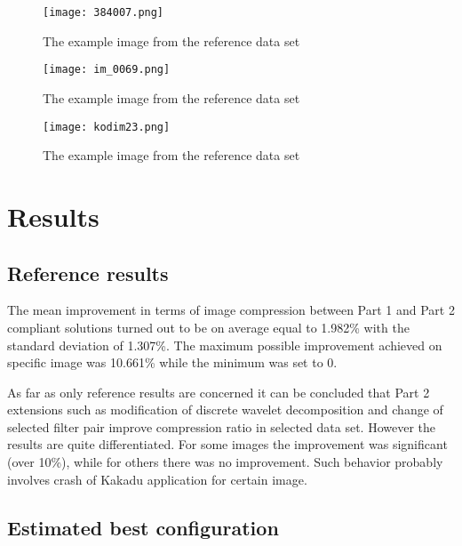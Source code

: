 \begin{figure}[!htb]
    \centering
    \texttt{[image: 384007.png]}
    \caption{The example image from the reference data set \cite{ref_images}}
    \label{fig:example_1}
\end{figure}

\begin{figure}[!htb]
    \centering
    \texttt{[image: im\_0069.png]}
    \caption{The example image from the reference data set \cite{ref_images}}
    \label{fig:example_2}
\end{figure}

\begin{figure}[!htb]
    \centering
    \texttt{[image: kodim23.png]}
    \caption{The example image from the reference data set \cite{ref_images}}
    \label{fig:example_3}
\end{figure}


\section{Results}

\subsection{Reference results} \label{sec:ref_results}

The mean improvement in terms of image compression between Part 1 and Part 2 compliant solutions
turned out to be on average equal to 1.982\% with the standard deviation of 1.307\%. The maximum
possible improvement achieved on specific image was 10.661\% while the minimum was set to 0.

As far as only reference results are concerned it can be concluded that Part 2 extensions such as modification
of discrete wavelet decomposition and change of selected filter pair improve compression ratio
in selected data set. However the results are quite differentiated. For some images the improvement
was significant (over 10\%), while for others there was no improvement. Such behavior probably
involves crash of Kakadu application for certain image.


\subsection{Estimated best configuration} \label{sec:my_results}

